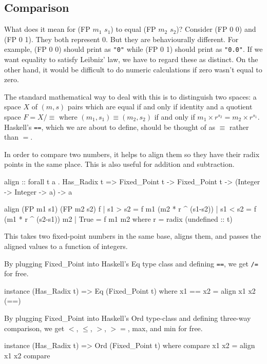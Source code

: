 \documentclass{article}
\begin{document}
\subsection{Comparison}

What does it mean for (FP $m_1$ $s_1$) to equal (FP $m_2$ $s_2$)?
Consider (FP 0 0) and (FP 0 1).  They both represent 0.  But they
are behaviourally different.  For example, (FP 0 0) should print
as \verb|"0"| while (FP 0 1) should print as \verb|"0.0"|.  If we
want equality to satisfy Leibniz' law, we have to regard these as
distinct.  On the other hand, it would be difficult to do numeric
calculations if zero wasn't equal to zero.

The standard mathematical way to deal with this is to distinguish
two spaces:  a space $X$ of $(m,s)$ pairs which are equal if and
only if identity and a quotient space $F = X/\equiv$ where
$(m_1,s_1) \equiv (m_2,s_2)$ if and only if $m_1\times r^{s_2} =
m_2 \times r^{s_1}$.  Haskell's \verb|==|, which we are about to
define, should be thought of as $\equiv$ rather than $=$.

In order to compare two numbers, it helps to align them so they
have their radix points in the same place.  This is also useful
for addition and subtraction.

\begin{code}
align :: forall t a . Has_Radix t =>
    Fixed_Point t -> Fixed_Point t -> (Integer -> Integer -> a) -> a

align (FP m1 s1) (FP m2 s2) f
  | s1 > s2 = f m1 (m2 * r ^ (s1-s2))
  | s1 < s2 = f (m1 * r ^ (s2-s1)) m2
  | True    = f m1 m2
  where r = radix (undefined :: t)
\end{code}

This takes two fixed-point numbers in the same base, aligns them,
and passes the aligned values to a function of integers.

By plugging Fixed\_Point into Haskell's Eq type class and
defining \verb|==|, we get \verb|/=| for free.

\begin{code}
instance (Has_Radix t) => Eq (Fixed_Point t)
  where x1 == x2 = align x1 x2 (==)
\end{code}

By plugging Fixed\_Point into Haskell's Ord type-class and
defining three-way comparison, we get $<$, $\le$, $>$, $>=$,
max, and min for free.

\begin{code}
instance (Has_Radix t) => Ord (Fixed_Point t)
  where compare x1 x2 = align x1 x2 compare
\end{code}
\end{document}

